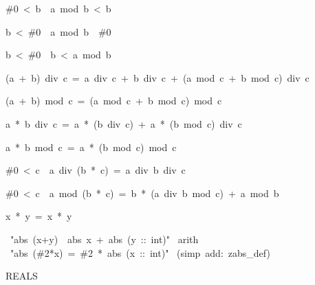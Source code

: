 \begin{isabelle}
\begin{isamarkuptext}
\begin{isabelle}
\#0\ <\ b\ \isasymLongrightarrow \ a\ mod\ b\ <\ b%
\end{isabelle}

\begin{isabelle}
b\ <\ \#0\ \isasymLongrightarrow \ a\ mod\ b\ \isasymle \ \#0
\end{isabelle}

\begin{isabelle}
b\ <\ \#0\ \isasymLongrightarrow \ b\ <\ a\ mod\ b%
\end{isabelle}

\begin{isabelle}
(a\ +\ b)\ div\ c\ =\ a\ div\ c\ +\ b\ div\ c\ +\ (a\ mod\ c\ +\ b\ mod\ c)\ div\ c%
\end{isabelle}

\begin{isabelle}
(a\ +\ b)\ mod\ c\ =\ (a\ mod\ c\ +\ b\ mod\ c)\ mod\ c%
\end{isabelle}

\begin{isabelle}
a\ *\ b\ div\ c\ =\ a\ *\ (b\ div\ c)\ +\ a\ *\ (b\ mod\ c)\ div\ c%
\end{isabelle}

\begin{isabelle}
a\ *\ b\ mod\ c\ =\ a\ *\ (b\ mod\ c)\ mod\ c%
\end{isabelle}

\begin{isabelle}
\#0\ <\ c\ \isasymLongrightarrow \ a\ div\ (b\ *\ c)\ =\ a\ div\ b\ div\ c%
\end{isabelle}

\begin{isabelle}
\#0\ <\ c\ \isasymLongrightarrow \ a\ mod\ (b\ *\ c)\ =\ b\ *\ (a\ div\ b\ mod\ c)\ +\ a\ mod\ b%
\end{isabelle}

\begin{isabelle}
\isasymbar x\ *\ y\isasymbar \ =\ \isasymbar x\isasymbar \ *\ \isasymbar y\isasymbar 
{}
\end{isabelle}
\end{isamarkuptext}
\ "abs\ (x+y)\ \isasymle \ abs\ x\ +\ abs\ (y\ ::\ int)"\isanewline
{}\ arith\isanewline
\isanewline
{}\ "abs\ (\#2*x)\ =\ \#2\ *\ abs\ (x\ ::\ int)"\isanewline
{}\ (simp\ add:\ zabs_def)
\begin{isamarkuptext}
REALS


\end{isamarkuptext}
\end{isabelle}
